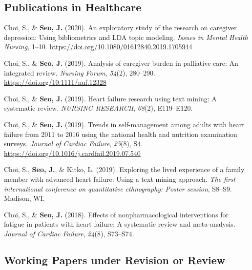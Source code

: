 \documentclass[11pt,a4paper,]{awesome-cv}
\begin{document}
\hypertarget{publications-in-healthcare}{%
  \subsection{Publications in
    Healthcare}\label{publications-in-healthcare}}

\hypertarget{refs_healthcare}{}
\leavevmode{}%
Choi, S., \& \textbf{Seo, J.} (2020). An exploratory study of the
research on caregiver depression: Using bibliometrics and LDA topic
modeling. \emph{Issues in Mental Health Nursing}, 1--10.
\url{https://doi.org/10.1080/01612840.2019.1705944}

\leavevmode{}%
Choi, S., \& \textbf{Seo, J.} (2019). Analysis of caregiver burden in
palliative care: An integrated review. \emph{Nursing Forum},
\emph{54}(2), 280--290. \url{https://doi.org/10.1111/nuf.12328}

\leavevmode{}%
Choi, S., \& \textbf{Seo, J.} (2019). Heart failure research using text
mining: A systematic review. \emph{NURSING RESEARCH}, \emph{68}(2),
E119--E120.

\leavevmode{}%
Choi, S., \& \textbf{Seo, J.} (2019). Trends in self-management among
adults with heart failure from 2011 to 2016 using the national health
and nutrition examination surveys. \emph{Journal of Cardiac Failure},
\emph{25}(8), S4. \url{https://doi.org/10.1016/j.cardfail.2019.07.540}

\leavevmode{}%
Choi, S., \textbf{Seo, J.}, \& Kitko, L. (2019). Exploring the lived
experience of a family member with advanced heart failure: Using a text
mining approach. \emph{The first international conference on
  quantitative ethnography: Poster session}, S8--S9. Madison, WI.

\leavevmode{}%
Choi, S., \& \textbf{Seo, J.} (2018). Effects of nonpharmacological
interventions for fatigue in patients with heart failure: A systematic
review and meta-analysis. \emph{Journal of Cardiac Failure},
\emph{24}(8), S73--S74.

\hypertarget{working-papers-under-revision-or-review}{%
  \subsection{Working Papers under Revision or
    Review}\label{working-papers-under-revision-or-review}}
\end{document}
